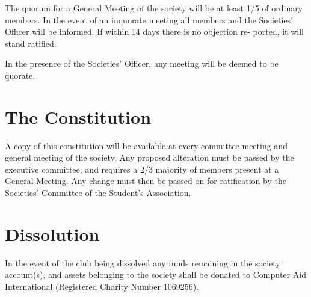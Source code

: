 \documentclass{article}
\begin{document}
The quorum for a General Meeting of the society will be at least 1/5 of
ordinary members. In the event of an inquorate meeting all members and the Societies’ Officer will be informed. If within 14 days there is no objection re-
ported, it will stand ratified.

In the presence of the Societies’ Officer, any meeting will be deemed to be
quorate.

\section{The Constitution}

A copy of this constitution will be available at every committee meeting and
general meeting of the society. Any proposed alteration must be passed by
the executive committee, and requires a 2/3 majority of members present at a
General Meeting. Any change must then be passed on for ratification by the
Societies’ Committee of the Student’s Association.

\section{Dissolution}

In the event of the club being dissolved any funds remaining in the society
account(s), and assets belonging to the society shall be donated to Computer
Aid International (Registered Charity Number 1069256).
\end{document}
